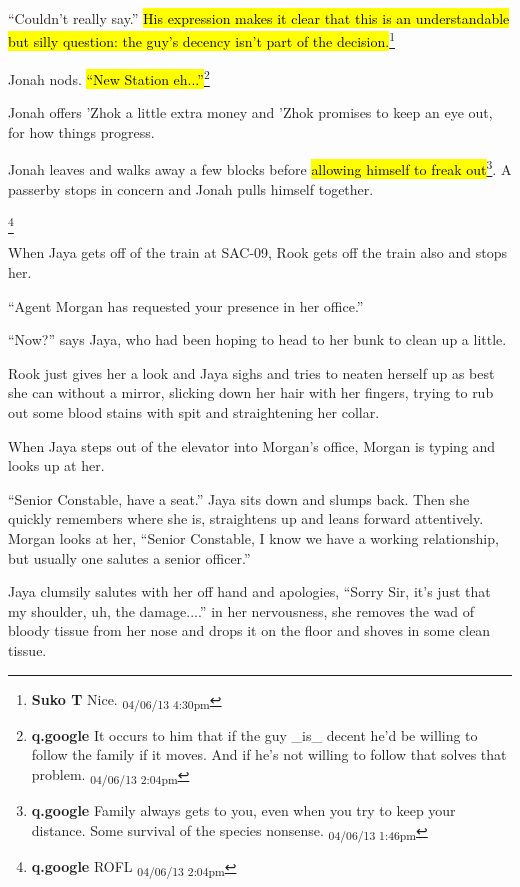 ``Couldn't really say.''  \hl{His expression makes it clear that this is an understandable but silly question: the guy's decency isn't part of the decision.}\footnote{\textbf{Suko T }Nice. \textsubscript{04/06/13 4:30pm}}

Jonah nods.  \hl{``New Station eh...''}\footnote{\textbf{q.google }It occurs to him that if the guy \_is\_ decent he'd be willing to follow the family if it moves.  And if he's not willing to follow that solves that problem. \textsubscript{04/06/13 2:04pm}}

Jonah offers 'Zhok a little extra money and 'Zhok promises to keep an eye out, for how things progress.



Jonah leaves and walks away a few blocks before \hl{allowing himself to freak out}\footnote{\textbf{q.google }Family always gets to you, even when you try to keep your distance.  Some survival of the species nonsense. \textsubscript{04/06/13 1:46pm}}.  A passerby stops in concern and Jonah pulls himself together.





 \footnote{\textbf{q.google }ROFL \textsubscript{04/06/13 2:04pm}}



When Jaya gets off of the train at SAC-09, Rook gets off the train also and stops her.

``Agent Morgan has requested your presence in her office.''

``Now?'' says Jaya, who had been hoping to head to her bunk to clean up a little.

Rook just gives her a look and Jaya sighs and tries to neaten herself up as best she can without  a mirror, slicking down her hair with her fingers, trying to rub out some blood stains with spit and straightening her collar.



When Jaya steps out of the elevator into Morgan's office, Morgan is typing and looks up at her.

``Senior Constable, have a seat.''  Jaya sits down and slumps back.  Then she quickly remembers where she is, straightens up and leans forward attentively. Morgan looks at her, ``Senior Constable, I know we have a working relationship, but usually one salutes a senior officer.''

Jaya clumsily salutes with her off hand and apologies, ``Sorry Sir, it's just that my shoulder, uh, the damage....'' in her nervousness, she removes the wad of bloody tissue from her nose and drops it on the floor and shoves in some clean tissue.

